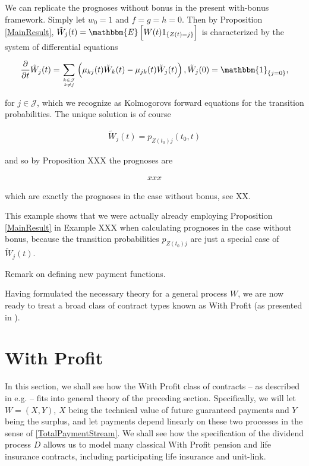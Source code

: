 \documentclass{book}
\newcommand{\1}[1]{\mathbbm{1}_{\left\lbrace #1 \right\rbrace}}
\newcommand{\expec}[1][def]{\mathbbm{E} \left[ #1 \right]}
\theoremstyle{break}
\theoremstyle{remark}
\newenvironment{remark}
  {\pushQED{\qed}\renewcommand{\qedsymbol}{\scalebox{1.4}{$\circ$}}\remarkx}
  {\popQED\endremarkx}
\numberwithin{equation}{section}
\begin{document}
\begin{remark} \label{WithoutBonusAsSpecialCase}
	We can replicate the prognoses without bonus in the present with-bonus framework. Simply let $w_0=1$ and $f=g=h=0$. Then by Proposition \ref{MainResult}, $\tilde{W}_j(t)=\expec[W(t) 1_{\{Z(t)=j\}}]$ is characterized by the system of differential equations
	
	\begin{align*}
	\frac{\partial}{\partial t} \tilde{W}_j(t) = \sum_{k \in \mathcal{J} \atop k \neq j} \left( \mu_{kj}(t) \tilde{W}_k(t) - \mu_{jk}(t) \tilde{W}_j(t) \right), \tilde{W}_j(0) = \1{j=0},
	\end{align*}
	
	for $j \in \mathcal{J}$, which we recognize as Kolmogorovs forward equations for the transition probabilities. The unique solution is of course
	
	\begin{align*}
	\tilde{W}_j(t) = p_{Z(t_0)j}(t_0,t)
	\end{align*}
	
	and so by Proposition XXX the prognoses are
	
	\begin{align*}
		xxx
	\end{align*}
	
	which are exactly the prognoses in the case without bonus, see XX.
	
	This example shows that we were actually already employing Proposition \ref{MainResult} in Example XXX when calculating prognoses in the case without bonus, because the transition probabilities $p_{Z(t_0)j}$ are just a special case of $\tilde{W}_j(t)$.
\end{remark}

Remark on defining new payment functions.

Having formulated the necessary theory for a general process $W$, we are now ready to treat a broad class of contract types known as With Profit (as presented in \cite{Liv2Bog}).

\section{With Profit}

In this section, we shall see how the With Profit class of contracts -- as described in e.g. \cite{Liv2Bogen} -- fits into general theory of the preceding section. Specifically, we will let $W=(X,Y)$, $X$ being the technical value of future guaranteed payments and $Y$ being the surplus, and let payments depend linearly on these two processes in the sense of \ref{TotalPaymentStream}. We shall see how the specification of the dividend process $D$ allows us to model many classical With Profit pension and life insurance contracts, including participating life insurance and unit-link.
\end{document}
